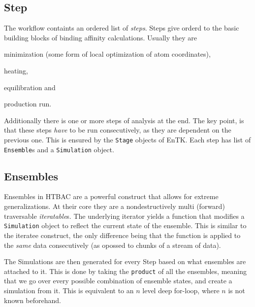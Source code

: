 \subsection{Step}

The workflow containts an ordered list of \emph{steps}. Steps give orderd to
the basic building blocks of binding affinity calculations. Usually they are

\begin{enumerate*}[label=(\roman*)]
  \item minimization (some form of local optimization of atom coordinates),
  \item heating,
  \item equilibration and
  \item production run.
\end{enumerate*}

Additionally there is one or more steps of analysis at the end. The key
point, is that these steps \emph{have} to be run consecutively, as they are
dependent on the previous one. This is ensured by the \texttt{Stage} objects
of EnTK\@. Each step has list of \texttt{Ensemble}s and a \texttt{Simulation}
object.

\subsection{Ensembles}

Ensembles in HTBAC are a powerful construct that allows for extreme
generalizations. At their core they are a nondestructively multi (forward)
traversable \emph{iteratable}s. The underlying iterator yields a function
that modifies a \texttt{Simulation} object to reflect the current state of
the ensemble. This is similar to the iteratee construct, the only difference
being that the function is applied to the \emph{same} data consecutively (as
opossed to chunks of a stream of data).

The Simulations are then generated for every Step based on what ensembles are
attached to it. This is done by taking the \texttt{product} of all the
ensembles, meaning that we go over every possible combination of ensemble
states, and create a simulation from it. This is equivalent to an $n$ level
deep for-loop, where $n$ is not known beforehand.

